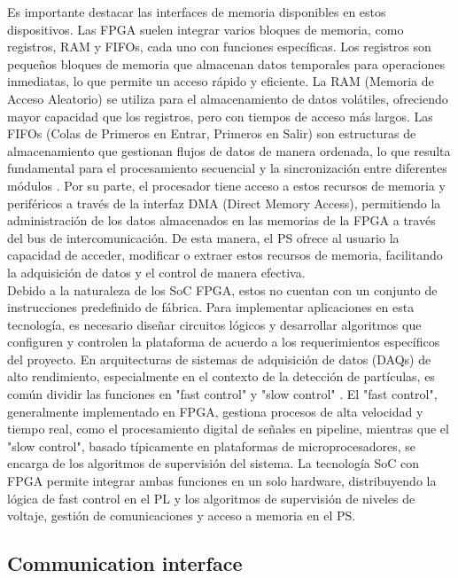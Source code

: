 \documentclass{report}
\begin{document}
\noindent Es importante destacar las interfaces de memoria disponibles en estos dispositivos. Las FPGA suelen integrar varios bloques de memoria, como registros, RAM y FIFOs, cada uno con funciones específicas. Los registros son pequeños bloques de memoria que almacenan datos temporales para operaciones inmediatas, lo que permite un acceso rápido y eficiente. La RAM (Memoria de Acceso Aleatorio) se utiliza para el almacenamiento de datos volátiles, ofreciendo mayor capacidad que los registros, pero con tiempos de acceso más largos. Las FIFOs (Colas de Primeros en Entrar, Primeros en Salir) son estructuras de almacenamiento que gestionan flujos de datos de manera ordenada, lo que resulta fundamental para el procesamiento secuencial y la sincronización entre diferentes módulos \cite{bravo2020new}. Por su parte, el procesador tiene acceso a estos recursos de memoria y periféricos a través de la interfaz DMA (Direct Memory Access), permitiendo la administración de los datos almacenados en las memorias de la FPGA a través del bus de intercomunicación. De esta manera, el PS ofrece al usuario la capacidad de acceder, modificar o extraer estos recursos de memoria, facilitando la adquisición de datos y el control de manera efectiva.\\

\noindent Debido a la naturaleza de los SoC FPGA, estos no cuentan con un conjunto de instrucciones predefinido de fábrica. Para implementar aplicaciones en esta tecnología, es necesario diseñar circuitos lógicos y desarrollar algoritmos que configuren y controlen la plataforma de acuerdo a los requerimientos específicos del proyecto. En arquitecturas de sistemas de adquisición de datos (DAQs) de alto rendimiento, especialmente en el contexto de la detección de partículas, es común dividir las funciones en "fast control" y "slow control" \cite{kolanoski8}. El "fast control", generalmente implementado en FPGA, gestiona procesos de alta velocidad y tiempo real, como el procesamiento digital de señales en pipeline, mientras que el "slow control", basado típicamente en plataformas de microprocesadores, se encarga de los algoritmos de supervisión del sistema. La tecnología SoC con FPGA permite integrar ambas funciones en un solo hardware, distribuyendo la lógica de fast control en el PL y los algoritmos de supervisión de niveles de voltaje, gestión de comunicaciones y acceso a memoria en el PS.

\subsection{Communication interface}
\label{sec:communication_interface}
\end{document}
